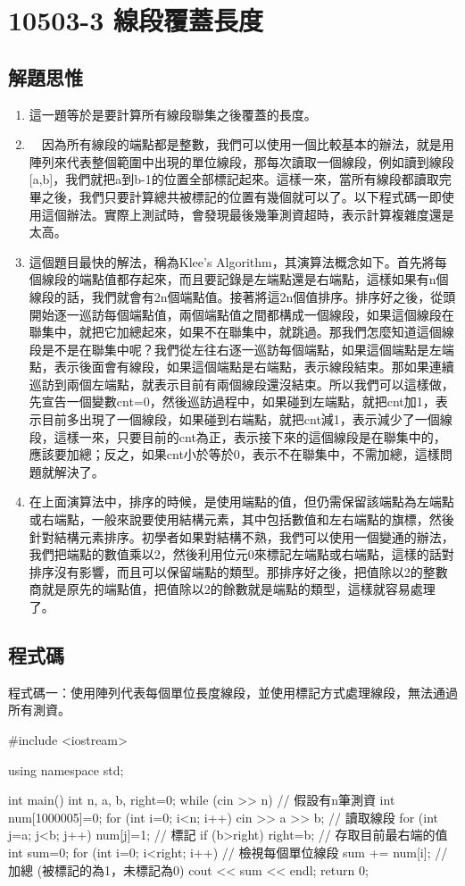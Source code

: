 \section{10503-3 線段覆蓋長度}

\subsection{解題思惟}
\begin{enumerate}
	\item 這一題等於是要計算所有線段聯集之後覆蓋的長度。
	\item　因為所有線段的端點都是整數，我們可以使用一個比較基本的辦法，就是用陣列來代表整個範圍中出現的單位線段，那每次讀取一個線段，例如讀到線段[a,b]，我們就把a到b-1的位置全部標記起來。這樣一來，當所有線段都讀取完畢之後，我們只要計算總共被標記的位置有幾個就可以了。以下程式碼一即使用這個辦法。實際上測試時，會發現最後幾筆測資超時，表示計算複雜度還是太高。
	\item 這個題目最快的解法，稱為Klee's Algorithm，其演算法概念如下。首先將每個線段的端點值都存起來，而且要記錄是左端點還是右端點，這樣如果有n個線段的話，我們就會有2n個端點值。接著將這2n個值排序。排序好之後，從頭開始逐一巡訪每個端點值，兩個端點值之間都構成一個線段，如果這個線段在聯集中，就把它加總起來，如果不在聯集中，就跳過。那我們怎麼知道這個線段是不是在聯集中呢？我們從左往右逐一巡訪每個端點，如果這個端點是左端點，表示後面會有線段，如果這個端點是右端點，表示線段結束。那如果連續巡訪到兩個左端點，就表示目前有兩個線段還沒結束。所以我們可以這樣做，先宣告一個變數cnt=0，然後巡訪過程中，如果碰到左端點，就把cnt加1，表示目前多出現了一個線段，如果碰到右端點，就把cnt減1，表示減少了一個線段，這樣一來，只要目前的cnt為正，表示接下來的這個線段是在聯集中的，應該要加總；反之，如果cnt小於等於0，表示不在聯集中，不需加總，這樣問題就解決了。
	\item 在上面演算法中，排序的時候，是使用端點的值，但仍需保留該端點為左端點或右端點，一般來說要使用結構元素，其中包括數值和左右端點的旗標，然後針對結構元素排序。初學者如果對結構不熟，我們可以使用一個變通的辦法，我們把端點的數值乘以2，然後利用位元0來標記左端點或右端點，這樣的話對排序沒有影響，而且可以保留端點的類型。那排序好之後，把值除以2的整數商就是原先的端點值，把值除以2的餘數就是端點的類型，這樣就容易處理了。
\end{enumerate}

\subsection{程式碼}
程式碼一：使用陣列代表每個單位長度線段，並使用標記方式處理線段，無法通過所有測資。
\begin{cppcode}
#include <iostream>

using namespace std;

int main()
{
	int n, a, b, right=0;
	while (cin >> n) { // 假設有n筆測資
		int num[1000005]={0};
		for (int i=0; i<n; i++) {
			cin >> a >> b; // 讀取線段 
			for (int j=a; j<b; j++) num[j]=1; // 標記
			if (b>right) right=b; // 存取目前最右端的值
		}
		int sum=0;
		for (int i=0; i<right; i++) { // 檢視每個單位線段
			sum += num[i]; // 加總 (被標記的為1，未標記為0)
		}
		cout << sum << endl;
	}
	return 0;
}
\end{cppcode}

